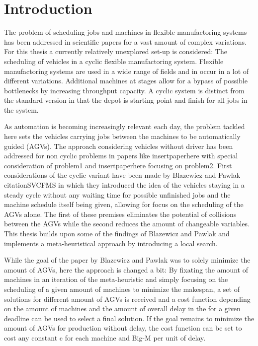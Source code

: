 \documentclass[11pt,a4paper]{report}
\begin{document}
\maketitle
\tableofcontents
\chapter{Introduction}
The problem of scheduling jobs and machines in flexible manufactoring systems has been addressed in scientific papers
for a vast amount of complex variations. For this thesis a currently relatively unexplored
set-up is considered: The scheduling of vehicles in a cyclic flexible manufactoring
system. Flexible manufactoring systems are used in a wide range of fields and in
occur in a lot of different variations. Additional machines at stages allow for a
bypass of possible bottlenecks by increasing throughput capacity. A cyclic system is
distinct from the standard version in that the depot is starting point and finish
for all jobs in the system. 

As automation is becoming increasingly relevant each day, the problem tackled here sets
the vehicles carrying jobs between the machines to be automatically guided (AGVs). The approach
considering vehicles without driver has been addressed for non cyclic problems in papers
like insertpaperhere with special consideration of problem1 and insertpaperhere focusing on 
problem2. First considerations of the cyclic variant have been made by Blazewicz and Pawlak citationSVCFMS
in which they introduced the idea of the vehicles staying in a steady cycle without any
waiting time for possible unfinished jobs and the machine schedule itself being given, allowing 
for focus on the scheduling of the AGVs alone. The first of these premises eliminates the potential of collisions between
the AGVs while the second reduces the amount of changeable variables. This thesis builds upon some of the 
findings of Blazewicz and Pawlak and implements a meta-heuristical approach by introducing a local search.

While the goal of the paper by Blazewicz and Pawlak was to solely minimize the amount of AGVs, here the approach is changed a bit:
By fixating the amount of machines in an iteration of the meta-heuristic and simply focusing on the scheduling of a given
amount of machines to minimize the makespan, a set of solutions for different amount of AGVs is received and a cost function depending
on the amount of machines and the amount of overall delay in the for a given deadline can be used to select a final
solution. If the goal remains to minimize the amount of AGVs for production without delay, the cost function can be set
to cost any constant c for each machine and Big-M per unit of delay.
\end{document}

